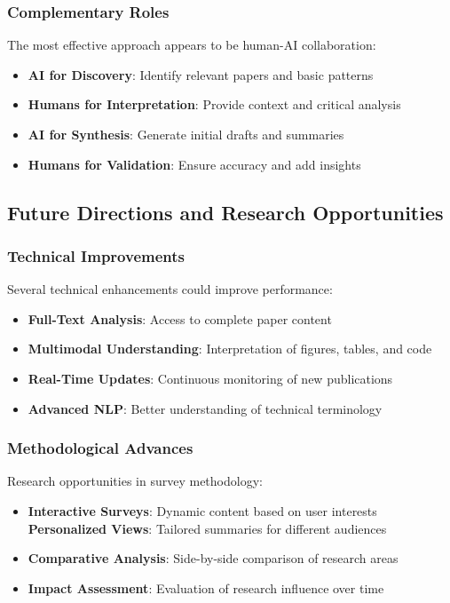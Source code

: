 \subsubsection{Complementary Roles}

The most effective approach appears to be human-AI collaboration:

\begin{itemize}
    \item \textbf{AI for Discovery}: Identify relevant papers and basic patterns
    \item \textbf{Humans for Interpretation}: Provide context and critical analysis
    \item \textbf{AI for Synthesis}: Generate initial drafts and summaries
    \item \textbf{Humans for Validation}: Ensure accuracy and add insights
\end{itemize}

\subsection{Future Directions and Research Opportunities}

\subsubsection{Technical Improvements}

Several technical enhancements could improve performance:

\begin{itemize}
    \item \textbf{Full-Text Analysis}: Access to complete paper content
    \item \textbf{Multimodal Understanding}: Interpretation of figures, tables, and code
    \item \textbf{Real-Time Updates}: Continuous monitoring of new publications
    \item \textbf{Advanced NLP}: Better understanding of technical terminology
\end{itemize}

\subsubsection{Methodological Advances}

Research opportunities in survey methodology:

\begin{itemize}
    \item \textbf{Interactive Surveys}: Dynamic content based on user interests
    \textbf{Personalized Views}: Tailored summaries for different audiences
    \item \textbf{Comparative Analysis}: Side-by-side comparison of research areas
    \item \textbf{Impact Assessment}: Evaluation of research influence over time
\end{itemize}

